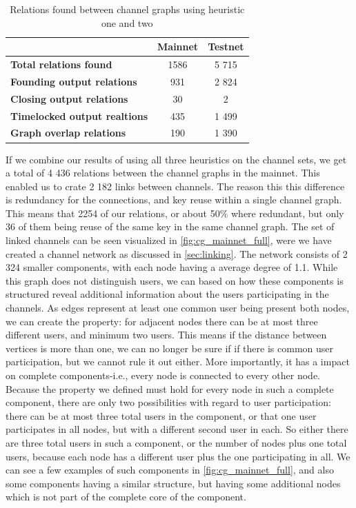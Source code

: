 \begin{table}[ht]
\centering
\caption{Relations found between channel graphs using heuristic one and two}
\label{table:connections}
\begin{tabular}{l|c|c}
                                        & \textbf{Mainnet} & \textbf{Testnet} \\ \hline
\textbf{Total relations found}       & 1586              & 5 715             \\ \hline
\textbf{Founding output relations}   & 931               & 2 824             \\ \hline
\textbf{Closing output relations}    & 30                & 2                \\ \hline
\textbf{Timelocked output realtions} & 435               & 1 499             \\ \hline
\textbf{Graph overlap relations}     & 190               & 1 390             \\ \hline
\end{tabular}
\end{table}

If we combine our results of using all three heuristics on the channel sets, we get a total of 4 436 relations between the channel graphs in the mainnet. This enabled us to crate 2 182 links between channels. The reason this this difference is redundancy for the connections, and key reuse within a single channel graph. This means that 2254 of our relations, or about 50\% where redundant, but only 36 of them being reuse of the same key in the same channel graph. The set of linked channels can be seen visualized in \cref{fig:cg_mainnet_full}, were we have created a channel network as discussed in \cref{sec:linking}. The network consists of 2 324 smaller components, with each node having a average degree of 1.1. While this graph does not distinguish users, we can based on how these components is structured reveal additional information about the users participating in the channels. 
As edges represent at least one common user being present both nodes, we can create the property: for adjacent nodes there can be at most three different users, and minimum two users. This means if the distance between vertices is more than one, we can no longer be sure if if there is common user participation, but we cannot rule it out either. More importantly, it has a impact on complete components-i.e., every node is connected to every other node. Because the property we defined must hold for every node in such a complete component, there are only two possibilities with regard to user participation: there can be at most three total users in the component, or that one user participates in all nodes, but with a different second user in each. 
So either there are three total users in such a component, or the number of nodes plus one total users, because each node has a different user plus the one participating in all.
We can see a few examples of such components in \cref{fig:cg_mainnet_full}, and also some components having a similar structure, but having some additional nodes which is not part of the complete core of the component.
\\

